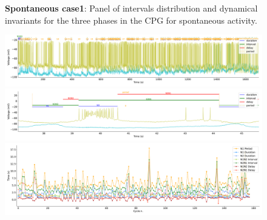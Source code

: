 \begin{figure}[htbp]
\begin{minipage}{0.9\textwidth}
\begin{minipage}[b]{0.53\textwidth}
\begin{minipage}[b]{\textwidth}
			\end{minipage}
		\end{minipage}
	\end{minipage}
	\caption{\textbf{Spontaneous case1}: Panel of intervals distribution and dynamical invariants for the three phases in the CPG for spontaneous activity.}
	\label{fig:prep1 invariants}
\end{figure}

\begin{figure}[htbp]
	\centering
	\begin{minipage}[b]{\textwidth}
		\centering
		\includegraphics[width=\textwidth,height=0.1\textheight]{./invariants/data/SUSSEX/prep1/images/spontaneous_2phases_signal_intervals_zoom.pdf}
		\includegraphics[width=\textwidth]{./invariants/data/SUSSEX/prep1/images/spontaneous_2phases_signal_intervals_cycle.pdf}
		\includegraphics[width=\textwidth]{./invariants/data/SUSSEX/prep1/images/spontaneous_2phases_time_cycle.pdf}
	\end{minipage}
	\centering
	\begin{minipage}{0.9\textwidth}
		\begin{minipage}[b]{0.45\textwidth}
			\centering

\end{minipage}
\end{minipage}
\end{figure}
